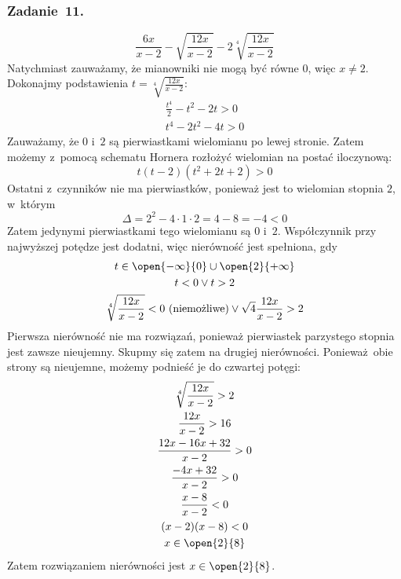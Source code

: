 \subsubsection*{Zadanie~11.}
\begin{equation*}
    \frac{6x}{x - 2} - \sqrt{\frac{12x}{x - 2}} - 2\sqrt[4]{\frac{12x}{x - 2}}
\end{equation*}
Natychmiast zauważamy, że mianowniki nie mogą być równe \(0\), więc \(x \neq 2\). Dokonajmy podstawienia \(t = \sqrt[4]{\frac{12x}{x - 2}}\):
\begin{gather*}
    \frac{t^4}{2} - t^2 - 2t > 0\\
    t^4 - 2t^2 - 4t > 0
\end{gather*}
Zauważamy, że \(0\) i~\(2\) są pierwiastkami wielomianu po lewej stronie. Zatem możemy z~pomocą schematu Hornera rozłożyć wielomian na postać iloczynową:
\begin{equation*}
    t(t - 2)(t^2 + 2t + 2) > 0
\end{equation*}
Ostatni z~czynników nie ma pierwiastków, ponieważ jest to wielomian stopnia \(2\), w~którym
\begin{equation*}
    \Delta = 2^2 - 4 \cdot 1 \cdot 2 = 4 - 8 = -4 < 0
\end{equation*}
Zatem jedynymi pierwiastkami tego wielomianu są \(0\) i~\(2\). Współczynnik przy najwyższej potędze jest dodatni, więc nierówność jest spełniona, gdy
\begin{gather*}
    t \in \open{-\infty}{0} \cup \open{2}{+\infty}\\
    t < 0 \lor t > 2\\
    \sqrt[4]{\frac{12x}{x - 2}} < 0 \text{ (niemożliwe)} \lor \sqrt{4}{\frac{12x}{x - 2}} > 2
\end{gather*}
Pierwsza nierówność nie ma rozwiązań, ponieważ pierwiastek parzystego stopnia jest zawsze nieujemny. Skupmy się zatem na drugiej nierówności. Ponieważ obie strony są nieujemne, możemy podnieść je do czwartej potęgi:
\begin{gather*}
    \sqrt[4]{\frac{12x}{x - 2}} > 2\\
    \frac{12x}{x - 2} > 16\\
    \frac{12x - 16x + 32}{x - 2} > 0\\
    \frac{-4x + 32}{x - 2} > 0\\
    \frac{x - 8}{x - 2} < 0\\
    (x - 2)(x - 8) < 0\\
    x \in \open{2}{8}
\end{gather*}
Zatem rozwiązaniem nierówności jest \(x \in \open{2}{8}\).
